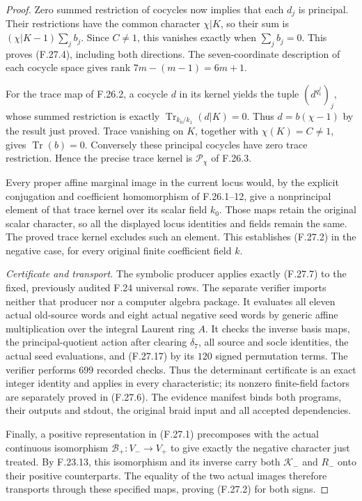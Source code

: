 \begin{proof}
Zero summed restriction of cocycles now implies
that each $d_j$ is principal. Their restrictions
have the common character $\chi|K$, so their
sum is $(\chi|K-1)\sum_jb_j$. Since $C\ne1$,
this vanishes exactly when $\sum_jb_j=0$.
This proves (F.27.4), including both directions.
The seven-coordinate description of each
cocycle space gives rank $7m-(m-1)=6m+1$.

For the trace map of F.26.2, a cocycle $d$ in
its kernel yields the tuple $(d^{q_1^j})_j$,
whose summed restriction is exactly
$\operatorname{Tr}_{k_0/k_1}(d|K)=0$.
Thus $d=b(\chi-1)$ by the result just proved.
Trace vanishing on $K$, together with
$\chi(K)=C\ne1$, gives $\operatorname{Tr}(b)=0$.
Conversely these principal cocycles have zero
trace restriction. Hence the precise trace
kernel is $\mathscr P_\chi$ of F.26.3.

Every proper affine marginal image in the current
locus would, by the explicit conjugation and
coefficient homomorphism of F.26.1--12, give a
nonprincipal element of that trace kernel over
its scalar field $k_0$. Those maps retain the
original scalar character, so all the displayed
locus identities and fields remain the same.
The proved trace kernel excludes such an element.
This establishes (F.27.2) in the negative case,
for every original finite coefficient field $k$.

\emph{Certificate and transport.}
The symbolic producer applies exactly (F.27.7)
to the fixed, previously audited F.24 universal
rows. The separate verifier imports neither
that producer nor a computer algebra package.
It evaluates all eleven actual old-source words
and eight actual negative seed words by generic
affine multiplication over the integral Laurent
ring $A$. It checks the inverse basis maps,
the principal-quotient action after clearing
$\delta_7$, all source and socle identities,
the actual seed evaluations, and (F.27.17)
by its $120$ signed permutation terms.
The verifier performs $699$ recorded checks.
Thus the determinant certificate is an exact
integer identity and applies in every characteristic;
its nonzero finite-field factors are separately
proved in (F.27.6). The evidence manifest binds
both programs, their outputs and stdout, the
original braid input and all accepted dependencies.

Finally, a positive representation in (F.27.1)
precomposes with the actual continuous isomorphism
$\mathcal B_+:V_-\to V_+$ to give exactly the
negative character just treated. By F.23.13,
this isomorphism and its inverse carry both
$\mathcal K_-$ and $R_-$ onto their positive
counterparts. The equality of the two actual
images therefore transports through these
specified maps, proving (F.27.2) for both signs.
\end{proof}
